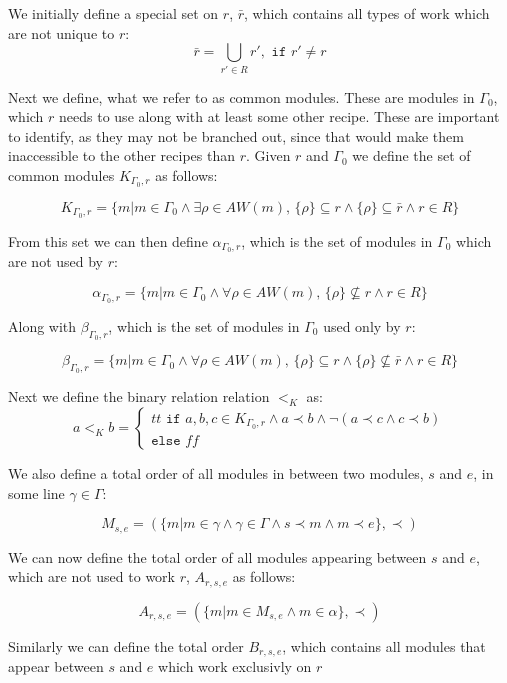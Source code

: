 We initially define a special set on $r$, $\bar{r}$, which contains all types of work which are not unique to $r$:
\[\bar{r} = \bigcup_{r' \in R}r', \texttt{ if } r' \neq r\]

Next we define, what we refer to as common modules. These are modules in $\Gamma_0$, which $r$ needs to use along with at least some other recipe. These are important to identify, as they may not be branched out, since that would make them inaccessible to the other recipes than $r$. Given $r$ and $\Gamma_0$ we define the set of common modules $K_{\Gamma_0,r}$ as follows:

\[K_{\Gamma_0 ,r} = \{m | m \in \Gamma_0  \land \exists \rho \in AW(m),\, \{\rho\} \subseteq r \land \{\rho\} \subseteq \bar{r} \land r \in R\}\]

From this set we can then define $\alpha_{\Gamma_0 ,r}$, which is the set of modules in $\Gamma_0$ which are not used by $r$: 

\[\alpha_{\Gamma_0 ,r}  = \{m |m \in \Gamma_0 \land \forall \rho \in AW(m),\, \{\rho\} \nsubseteq r \land r \in R\}\]

Along with $\beta_{\Gamma_0 ,r}$, which is the set of modules in $\Gamma_0$ used only by $r$:

\[\beta_{\Gamma_0 ,r}  = \{m  | m \in \Gamma_0 \land \forall \rho \in AW(m),\, \{\rho\} \subseteq r \land \{\rho\} \nsubseteq \bar{r} \land r \in R\}\]

Next we define the binary relation relation $<_K$ as:
\[a <_K b = \left\{\begin{matrix}
tt \texttt{ if } a,b,c \in K_{\Gamma_0 ,r} \land a \prec b \land \lnot (a \prec c \land c \prec b) \\ \texttt{else } ff
\end{matrix}\right.\]

We also define a total order of all modules in between two modules, $s$ and $e$, in some line $\gamma \in \Gamma$:

\[M_{s,e} = (\{m | m \in \gamma \land \gamma \in \Gamma \land s \prec m \land m \prec e\}, \prec)\]

We can now define the total order of all modules appearing between $s$ and $e$, which are not used to work $r$, $A_{r,s,e}$ as follows: 

\[A_{r,s,e} = (\{m |m \in M_{s,e} \land m \in \alpha\}, \prec)\]

Similarly we can define the total order $B_{r,s,e}$, which contains all modules that appear between $s$ and $e$ which work exclusivly on $r$


